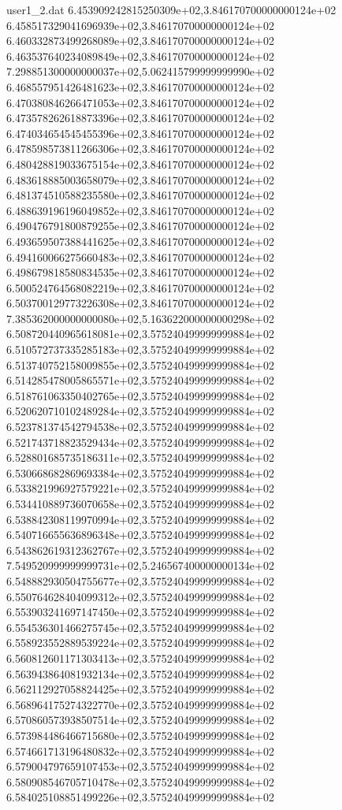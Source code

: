 \begin{filecontents}{user1_2.dat}
6.453909242815250309e+02,3.846170700000000124e+02
6.458517329041696939e+02,3.846170700000000124e+02
6.460332873499268089e+02,3.846170700000000124e+02
6.463537640234089849e+02,3.846170700000000124e+02
7.298851300000000037e+02,5.062415799999999990e+02
6.468557951426481623e+02,3.846170700000000124e+02
6.470380846266471053e+02,3.846170700000000124e+02
6.473578262618873396e+02,3.846170700000000124e+02
6.474034654545455396e+02,3.846170700000000124e+02
6.478598573811266306e+02,3.846170700000000124e+02
6.480428819033675154e+02,3.846170700000000124e+02
6.483618885003658079e+02,3.846170700000000124e+02
6.481374510588235580e+02,3.846170700000000124e+02
6.488639196196049852e+02,3.846170700000000124e+02
6.490476791800879255e+02,3.846170700000000124e+02
6.493659507388441625e+02,3.846170700000000124e+02
6.494160066275660483e+02,3.846170700000000124e+02
6.498679818580834535e+02,3.846170700000000124e+02
6.500524764568082219e+02,3.846170700000000124e+02
6.503700129773226308e+02,3.846170700000000124e+02
7.385362000000000080e+02,5.163622000000000298e+02
6.508720440965618081e+02,3.575240499999999884e+02
6.510572737335285183e+02,3.575240499999999884e+02
6.513740752158009855e+02,3.575240499999999884e+02
6.514285478005865571e+02,3.575240499999999884e+02
6.518761063350402765e+02,3.575240499999999884e+02
6.520620710102489284e+02,3.575240499999999884e+02
6.523781374542794538e+02,3.575240499999999884e+02
6.521743718823529434e+02,3.575240499999999884e+02
6.528801685735186311e+02,3.575240499999999884e+02
6.530668682869693384e+02,3.575240499999999884e+02
6.533821996927579221e+02,3.575240499999999884e+02
6.534410889736070658e+02,3.575240499999999884e+02
6.538842308119970994e+02,3.575240499999999884e+02
6.540716655636896348e+02,3.575240499999999884e+02
6.543862619312362767e+02,3.575240499999999884e+02
7.549520999999999731e+02,5.246567400000000134e+02
6.548882930504755677e+02,3.575240499999999884e+02
6.550764628404099312e+02,3.575240499999999884e+02
6.553903241697147450e+02,3.575240499999999884e+02
6.554536301466275745e+02,3.575240499999999884e+02
6.558923552889539224e+02,3.575240499999999884e+02
6.560812601171303413e+02,3.575240499999999884e+02
6.563943864081932134e+02,3.575240499999999884e+02
6.562112927058824425e+02,3.575240499999999884e+02
6.568964175274322770e+02,3.575240499999999884e+02
6.570860573938507514e+02,3.575240499999999884e+02
6.573984486466715680e+02,3.575240499999999884e+02
6.574661713196480832e+02,3.575240499999999884e+02
6.579004797659107453e+02,3.575240499999999884e+02
6.580908546705710478e+02,3.575240499999999884e+02
6.584025108851499226e+02,3.575240499999999884e+02

\end{filecontents}

